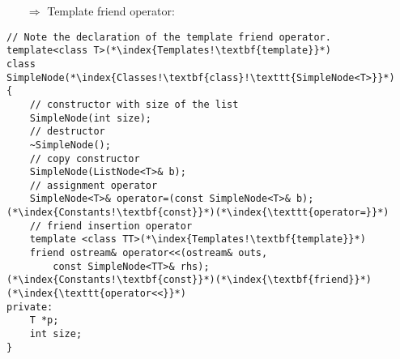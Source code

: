 \documentclass[10pt]{book}
\begin{document}
\begin{enumerate}
\item[$\Rightarrow$] Template friend operator:
\end{enumerate}
\begin{lstlisting}
// Note the declaration of the template friend operator.
template<class T>(*\index{Templates!\textbf{template}}*)
class SimpleNode(*\index{Classes!\textbf{class}!\texttt{SimpleNode<T>}}*)
{
    // constructor with size of the list
    SimpleNode(int size);
    // destructor
    ~SimpleNode();
    // copy constructor
    SimpleNode(ListNode<T>& b);
    // assignment operator
    SimpleNode<T>& operator=(const SimpleNode<T>& b);(*\index{Constants!\textbf{const}}*)(*\index{\texttt{operator=}}*)
    // friend insertion operator
    template <class TT>(*\index{Templates!\textbf{template}}*)
    friend ostream& operator<<(ostream& outs,
        const SimpleNode<TT>& rhs);(*\index{Constants!\textbf{const}}*)(*\index{\textbf{friend}}*)(*\index{\texttt{operator<<}}*)
private:
    T *p;
    int size;
}
\end{lstlisting}
%
%
\end{document}
